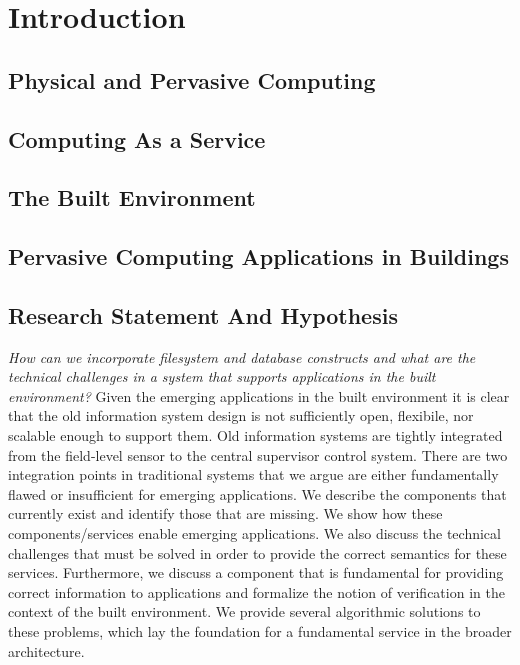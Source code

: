 \documentclass{ucbthesis}
\begin{document}
\pagestyle{headings}


\chapter{Introduction}
\section{Physical and Pervasive Computing}
\section{Computing As a Service}
\section{The Built Environment}
\section{Pervasive Computing Applications in Buildings}
\section{Research Statement And Hypothesis}
\emph{How can we incorporate filesystem and database constructs and what are the technical challenges in a system that supports applications
in the built environment?}
Given the emerging applications in
the built environment it is clear that the old information system design is not sufficiently open, flexibile, nor
scalable enough to support them.  Old information systems are tightly integrated from the field-level sensor to
the central supervisor control system.  There are two integration points in traditional systems that we argue 
are either fundamentally flawed or insufficient for emerging applications.  We describe the components that 
currently exist and identify those that are missing.  We show how these components/services enable emerging applications.  We also
discuss the technical challenges that must be solved in order to provide the correct semantics for these services.
Furthermore, we discuss a component that is fundamental for providing correct information to applications 
and formalize the notion of verification in the context of the built environment.  We provide several algorithmic 
solutions to these problems, which lay the foundation for a fundamental service in the broader architecture.
\end{document}
